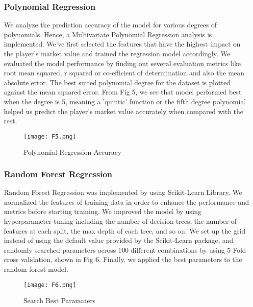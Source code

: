 \documentclass[conference]{IEEEtran}
\begin{document}
\subsubsection{Polynomial Regression}
We analyze the prediction accuracy of the model for various degrees of polynomials. Hence, a Multivariate Polynomial Regression analysis is implemented. We’ve first selected the features that have the highest impact on the player’s market value and trained the regression model accordingly. We evaluated the model performance by finding out several evaluation metrics like root mean squared, r squared or co-efficient of determination and also the mean absolute error. The best suited polynomial degree for the dataset is plotted against the mean squared error. From Fig 5, we see that model performed best when the degree is 5, meaning a 'quintic' function or the fifth degree polynomial helped us predict the player's market value accurately when compared with the rest.
\begin{figure}[ht]
\begin{center}
\centerline{\texttt{[image: F5.png]}}
\caption{Polynomial Regression Accuracy}
\label{bayespic}
\end{center}
\end{figure}


\subsubsection{Random Forest Regression}
Random Forest Regression was implemented by using Scikit-Learn Library. We normalized the features of training data in order to enhance the performance and metrics before starting training. We improved the model by using hyperparameter tuning including the number of decision trees, the number of features at each split, the max depth of each tree, and so on. We set up the grid instead of using the default value provided by the Scikit-Learn package, and randomly searched parameters across 100 different combinations by using 5-Fold cross validation, shown in Fig 6. Finally, we applied the best parameters to the random forest model.
\begin{figure}[ht]
\begin{center}
\centerline{\texttt{[image: F6.png]}}
\caption{Search Best Paramaters}
\label{bayespic}
\end{center}
\end{figure}
\end{document}
